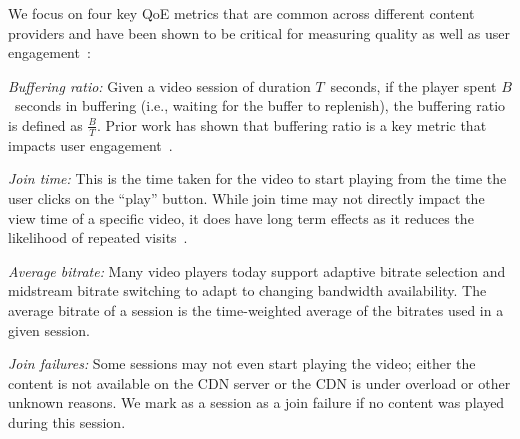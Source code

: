 We focus on  four key QoE metrics that are common across 
different  content providers and have been shown to be
 critical for measuring quality as well as user
  engagement~\cite{sigcomm11}: 
\begin{packedenumerate}
\item \emph{Buffering ratio:}  Given a video session of 
duration $T$~seconds,  if the player spent $B$~seconds in 
buffering (i.e., waiting for the 
 buffer to replenish), the buffering ratio is defined as 
 $\frac{B}{T}$. 
 Prior work has shown that buffering ratio is a key metric
 that impacts user engagement~\cite{sigcomm11}.

\item \emph{Join time:}  This is the time taken for the video 
to start playing  from the time the user clicks on the ``play'' 
button. 
 While join time may not directly impact the view time of a 
 specific video,
 it does have long term effects as it reduces the likelihood 
 of repeated visits~\cite{sigcomm11,imc12akamai}.  
 

\item \emph{Average bitrate:} 
Many video players today support adaptive bitrate
selection and midstream bitrate switching to adapt to 
changing bandwidth availability. 
The average bitrate of a session is the time-weighted
average of the bitrates used in a given session. 


\item \emph{Join failures:}   Some sessions may not even 
start playing the video; either the content is not available
 on the CDN server or the CDN is under overload or other 
unknown reasons. We mark as a session as a join failure
if no content was played during this session.


\end{packedenumerate}


